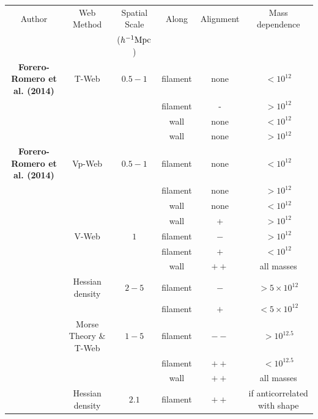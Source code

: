 \documentclass[useAMS,usenatbib]{mn2e}
\newcommand{\hMpc}{{\ifmmode{h^{-1}{\rm Mpc}}\else{$h^{-1}$Mpc }\fi}}
\newcommand{\hMsun}{{\ifmmode{h^{-1}{\rm
        {M_{\odot}}}}\else{$h^{-1}{\rm{M_{\odot}}}$}\fi}}
\begin{document}
\begin{table}
\begin{tabular}{cccccc}\hline\hline
Author & Web Method & Spatial Scale& Along &
Alignment & Mass dependence\\
 & & ($\hMpc$)& & & \\\hline

{\bf Forero-Romero et al. (2014)} & T-Web & $0.5-1$ & 
filament &none & $<10^{12}$\hMsun\\

&   & & 
filament & - & $>10^{12}$\hMsun\\

&   & & 
wall & none & $<10^{12}$\hMsun\\

&   & & 
wall & none & $>10^{12}$\hMsun\\\hline

{\bf Forero-Romero et al. (2014)} & Vp-Web & $0.5-1$ & 
filament &none & $<10^{12}$\hMsun\\

&   & & 
filament & none & $>10^{12}$\hMsun\\

&   & & 
wall & none & $<10^{12}$\hMsun\\

&   & & 
wall & + & $>10^{12}$\hMsun\\\hline

\cite{Libeskind2013} & V-Web & $1$ & 
filament &$-$ & $>10^{12}$\hMsun\\

&   & & 
filament &$+$ & $<10^{12}$\hMsun\\

&   & & 
wall & $++$ & all masses\\\hline

\cite{Trowland2013} & Hessian density & $2-5$ & 
filament & $-$ & $> 5\times 10^{12}$\hMsun\\
&   & & 
filament & $+$ & $< 5\times 10^{12}$\hMsun\\\hline

\cite{Codis2012} & Morse Theory \& T-Web & $1-5$ & 
filament & $--$ & $>10^{12.5}$\hMsun \\ 

&   & & 
filament & $++$ & $<10^{12.5}$\hMsun \\ 

& & & 
wall & $++$ & all masses\\\hline

\cite{Zhang2009}  & Hessian density &  $2.1$ & 
filament & $++$ & if anticorrelated with shape\\


\end{tabular}
\end{table}
\end{document}

